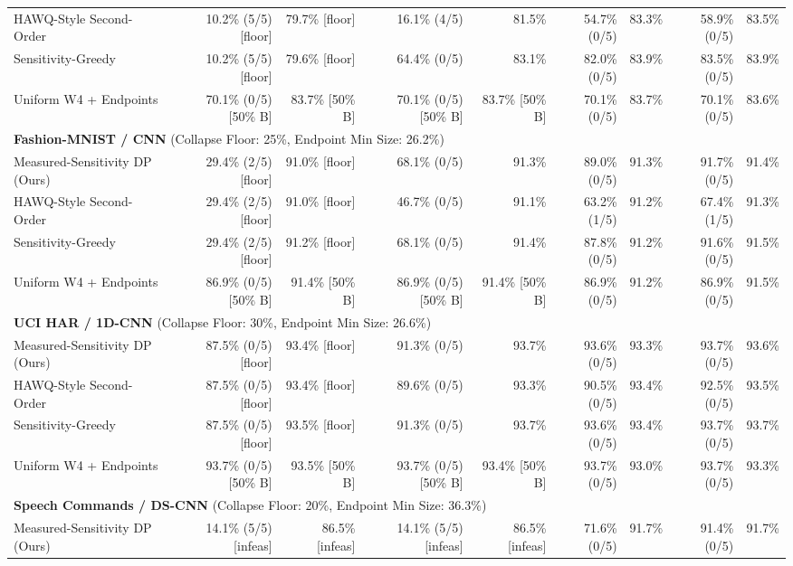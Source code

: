 \begin{table}[!t]
\begin{tabular}{lrrrrrrrr}
\quad HAWQ-Style Second-Order & 10.2\% (5/5) [floor] & 79.7\% [floor] & 16.1\% (4/5) & 81.5\% & 54.7\% (0/5) & 83.3\% & 58.9\% (0/5) & 83.5\% \\
\quad Sensitivity-Greedy & 10.2\% (5/5) [floor] & 79.6\% [floor] & 64.4\% (0/5) & 83.1\% & 82.0\% (0/5) & 83.9\% & 83.5\% (0/5) & 83.9\% \\
\quad Uniform W4 + Endpoints & 70.1\% (0/5) [50\% B] & 83.7\% [50\% B] & 70.1\% (0/5) [50\% B] & 83.7\% [50\% B] & 70.1\% (0/5) & 83.7\% & 70.1\% (0/5) & 83.6\% \\
\midrule
\multicolumn{9}{l}{\textbf{Fashion-MNIST / CNN} (Collapse Floor: 25\%, Endpoint Min Size: 26.2\%)}\\
\quad Measured-Sensitivity DP (Ours) & 29.4\% (2/5) [floor] & 91.0\% [floor] & 68.1\% (0/5) & 91.3\% & 89.0\% (0/5) & 91.3\% & 91.7\% (0/5) & 91.4\% \\
\quad HAWQ-Style Second-Order & 29.4\% (2/5) [floor] & 91.0\% [floor] & 46.7\% (0/5) & 91.1\% & 63.2\% (1/5) & 91.2\% & 67.4\% (1/5) & 91.3\% \\
\quad Sensitivity-Greedy & 29.4\% (2/5) [floor] & 91.2\% [floor] & 68.1\% (0/5) & 91.4\% & 87.8\% (0/5) & 91.2\% & 91.6\% (0/5) & 91.5\% \\
\quad Uniform W4 + Endpoints & 86.9\% (0/5) [50\% B] & 91.4\% [50\% B] & 86.9\% (0/5) [50\% B] & 91.4\% [50\% B] & 86.9\% (0/5) & 91.2\% & 86.9\% (0/5) & 91.5\% \\
\midrule
\multicolumn{9}{l}{\textbf{UCI HAR / 1D-CNN} (Collapse Floor: 30\%, Endpoint Min Size: 26.6\%)}\\
\quad Measured-Sensitivity DP (Ours) & 87.5\% (0/5) [floor] & 93.4\% [floor] & 91.3\% (0/5) & 93.7\% & 93.6\% (0/5) & 93.3\% & 93.7\% (0/5) & 93.6\% \\
\quad HAWQ-Style Second-Order & 87.5\% (0/5) [floor] & 93.4\% [floor] & 89.6\% (0/5) & 93.3\% & 90.5\% (0/5) & 93.4\% & 92.5\% (0/5) & 93.5\% \\
\quad Sensitivity-Greedy & 87.5\% (0/5) [floor] & 93.5\% [floor] & 91.3\% (0/5) & 93.7\% & 93.6\% (0/5) & 93.4\% & 93.7\% (0/5) & 93.7\% \\
\quad Uniform W4 + Endpoints & 93.7\% (0/5) [50\% B] & 93.5\% [50\% B] & 93.7\% (0/5) [50\% B] & 93.4\% [50\% B] & 93.7\% (0/5) & 93.0\% & 93.7\% (0/5) & 93.3\% \\
\midrule
\multicolumn{9}{l}{\textbf{Speech Commands / DS-CNN} (Collapse Floor: 20\%, Endpoint Min Size: 36.3\%)}\\
\quad Measured-Sensitivity DP (Ours) & 14.1\% (5/5) [infeas] & 86.5\% [infeas] & 14.1\% (5/5) [infeas] & 86.5\% [infeas] & 71.6\% (0/5) & 91.7\% & 91.4\% (0/5) & 91.7\% \\

\end{tabular}
\end{table}
